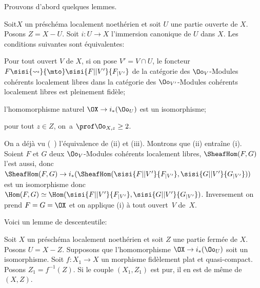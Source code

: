 Prouvons d'abord quelques lemmes.

\begin{lemme} \label{X.3.5}
Soit\pageoriginale $X$ un pr\'esch\'ema localement noeth\'erien et soit $U$ une partie ouverte de $X$. Posons $Z=X-U$. Soit $i\colon U\to X$ l'immersion canonique de $U$ dans $X$. Les conditions suivantes sont \'equivalentes:
\begin{enumeratei}
\item
Pour tout ouvert $V$ de $X$, si on pose $V'=V\cap U$, le foncteur $F\sisi{\rightsquigarrow}{\mto} \sisi{F|{|V'}}{F_{|V'}}$ de la cat\'egorie des $\Oo_V$-Modules coh\'erents localement libres dans la cat\'egorie des $\Oo_{{V'}}$-Modules coh\'erents localement libres est pleinement fid\`ele;

\item
l'homomorphisme naturel $\OX \to i_\ast(\Oo_{U})$ est un isomorphisme;

\item
pour tout $z\in Z$, on~a $\prof\Oo_{X, z}\geq 2$.
\end{enumeratei}
\end{lemme}

On a d\'ej\`a vu (~) l'\'equivalence de (ii) et (iii). Montrons que (ii) entra\^ine (i). Soient $F$ et $G$ deux $\Oo_V$-Modules coh\'erents localement libres, $\SheafHom(F, G)$ l'est aussi, donc $\SheafHom(F, G)\to i_\ast(\SheafHom(\sisi{F|{|V'}}{F_{|V'}}, \sisi{G|{|V'}}{G_{|V'}}))$ est un isomorphisme donc $\Hom(F, G)\simeq\Hom(\sisi{F|{|V'}}{F_{|V'}}, \sisi{G|{|V'}}{G_{|V'}})$. Inversement on prend $F=G=\OX$ et on applique (i) \`a tout ouvert~$V$ de~$X$.

Voici un \og lemme de descente\fg utile:

\begin{lemme} \label{X.3.6} Soit $X$ un pr\'esch\'ema localement noeth\'erien et soit $Z$ une partie ferm\'ee de $X$. Posons $U=X-Z$. Supposons que l'homomorphisme $\OX \to i_\ast(\Oo_U)$ soit un isomorphisme. Soit $f\colon X_1\to X$ un morphisme fid\`element plat et quasi-compact. Posons $Z_1=f^{-1}(Z)$. Si le couple $(X_1, Z_1)$ est pur, il en est de m\^eme de $(X, Z)$.
\end{lemme}

